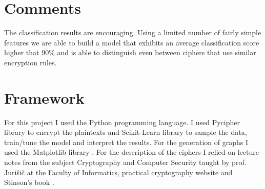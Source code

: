 \documentclass[a4paper]{article}
\begin{document}
\section*{Comments}
The classification results are encouraging. Using a limited number of fairly simple features we are able to build a model that exhibits an average classification score higher that $90\%$ and is able to distinguish even between ciphers that use similar encryption rules.

\section*{Framework}
For this project I used the Python programming language. I used Pycipher library \cite{pycipher} to encrypt the plaintexts and Scikit-Learn library \cite{scikit-learn} to sample the data, train/tune the model and interpret the results. For the generation of graphs I used the Matplotlib library \cite{Hunter:2007}. For the description of the ciphers I relied on lecture notes from the subject Cryptography and Computer Security taught by prof. Jurišič at the Faculty of Informatics, practical cryptography website \cite{practicalCrypto} and Stinson's book \cite{stinson2005cryptography}.



\end{document}
